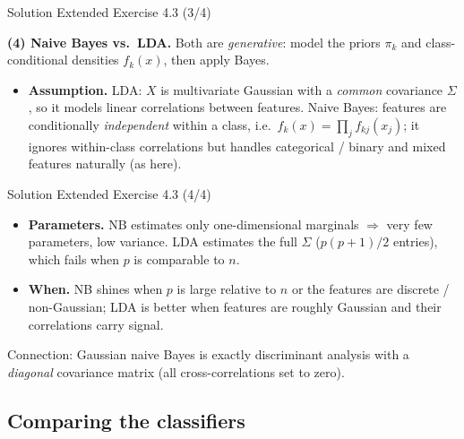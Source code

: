 \documentclass[aspectratio=169,11pt]{beamer}
\begin{document}
\begin{frame}{Solution \textemdash{} Extended Exercise 4.3 (3/4)}
\begin{solutionbox}
\textbf{(4) Naive Bayes vs.\ LDA.} Both are \emph{generative}: model the
priors $\pi_k$ and class-conditional densities $f_k(x)$, then apply Bayes.
\begin{itemize}
  \item \textbf{Assumption.} LDA: $X$ is multivariate Gaussian with a
        \emph{common} covariance $\Sigma$, so it models linear
        correlations between features. Naive Bayes: features are
        conditionally \emph{independent} within a class, i.e.\
        $f_k(x)=\prod_j f_{kj}(x_j)$; it ignores within-class
        correlations but handles categorical / binary and mixed features
        naturally (as here).
  \end{itemize}
\end{solutionbox}
\end{frame}

\begin{frame}{Solution \textemdash{} Extended Exercise 4.3 (4/4)}
\begin{solutionbox}
  \begin{itemize}
  \item \textbf{Parameters.} NB estimates only one-dimensional marginals
        $\Rightarrow$ very few parameters, low variance. LDA estimates the
        full $\Sigma$ ($p(p+1)/2$ entries), which fails when $p$ is
        comparable to $n$.
  \item \textbf{When.} NB shines when $p$ is large relative to $n$ or the
        features are discrete / non-Gaussian; LDA is better when features
        are roughly Gaussian and their correlations carry signal.
\end{itemize}
Connection: Gaussian naive Bayes is exactly discriminant analysis with a
\emph{diagonal} covariance matrix (all cross-correlations set to zero).
\end{solutionbox}
\end{frame}

\subsection{Comparing the classifiers}
\end{document}
